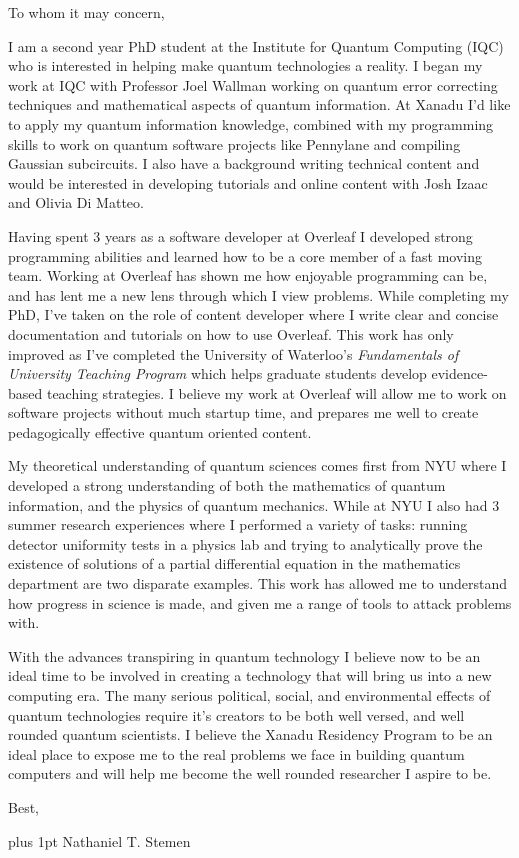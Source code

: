 \documentclass[12pt]{article}
\begin{document}
\noindent
To whom it may concern,

I am a second year PhD student at the Institute for Quantum Computing (IQC) who is interested in helping make quantum technologies a reality.
I began my work at IQC with Professor Joel Wallman working on quantum error correcting techniques and mathematical aspects of quantum information.
At Xanadu I'd like to apply my quantum information knowledge, combined with my programming skills to work on quantum software projects like Pennylane and compiling Gaussian subcircuits.
I also have a background writing technical content and would be interested in developing tutorials and online content with Josh Izaac and Olivia Di Matteo.

Having spent 3 years as a software developer at Overleaf I developed strong programming abilities and learned how to be a core member of a fast moving team.
Working at Overleaf has shown me how enjoyable programming can be, and has lent me a new lens through which I view problems.
While completing my PhD, I've taken on the role of content developer where I write clear and concise documentation and tutorials on how to use Overleaf.
This work has only improved as I've completed the University of Waterloo's \emph{Fundamentals of University Teaching Program} which helps graduate students develop evidence-based teaching strategies.
I believe my work at Overleaf will allow me to work on software projects without much startup time, and prepares me well to create pedagogically effective quantum oriented content.

My theoretical understanding of quantum sciences comes first from NYU where I developed a strong understanding of both the mathematics of quantum information, and the physics of quantum mechanics.
While at NYU I also had 3 summer research experiences where I performed a variety of tasks: running detector uniformity tests in a physics lab and trying to analytically prove the existence of solutions of a partial differential equation in the mathematics department are two disparate examples.
This work has allowed me to understand how progress in science is made, and given me a range of tools to attack problems with.

With the advances transpiring in quantum technology I believe now to be an ideal time to be involved in creating a technology that will bring us into a new computing era.
The many serious political, social, and environmental effects of quantum technologies require it's creators to be both well versed, and well rounded quantum scientists.
I believe the Xanadu Residency Program to be an ideal place to expose me to the real problems we face in building quantum computers and will help me become the well rounded researcher I aspire to be.

\noindent
Best,

\parskip=0pt plus 1pt
Nathaniel T. Stemen
\end{document}
